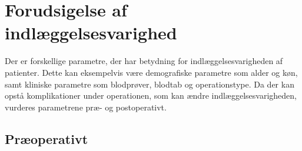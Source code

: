 \section{Forudsigelse af indlæggelsesvarighed}
Der er forskellige parametre, der har betydning for indlæggelsesvarigheden af patienter. Dette kan eksempelvis være demografiske parametre som alder og køn, samt kliniske parametre som blodprøver, blodtab og operationstype. Da der kan opstå komplikationer under operationen, som kan ændre indlæggelsesvarigheden, vurderes parametrene præ- og postoperativt.

\subsection{Præoperativt}
